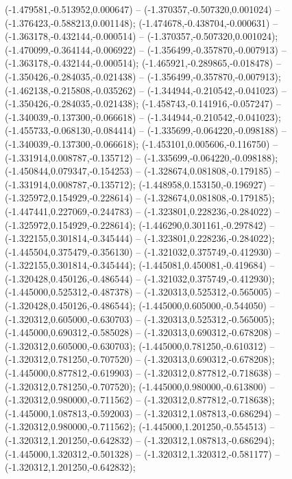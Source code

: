  (-1.479581,-0.513952,0.000647) -- (-1.370357,-0.507320,0.001024) -- (-1.376423,-0.588213,0.001148);
 (-1.474678,-0.438704,-0.000631) -- (-1.363178,-0.432144,-0.000514) -- (-1.370357,-0.507320,0.001024);
 (-1.470099,-0.364144,-0.006922) -- (-1.356499,-0.357870,-0.007913) -- (-1.363178,-0.432144,-0.000514);
 (-1.465921,-0.289865,-0.018478) -- (-1.350426,-0.284035,-0.021438) -- (-1.356499,-0.357870,-0.007913);
 (-1.462138,-0.215808,-0.035262) -- (-1.344944,-0.210542,-0.041023) -- (-1.350426,-0.284035,-0.021438);
 (-1.458743,-0.141916,-0.057247) -- (-1.340039,-0.137300,-0.066618) -- (-1.344944,-0.210542,-0.041023);
 (-1.455733,-0.068130,-0.084414) -- (-1.335699,-0.064220,-0.098188) -- (-1.340039,-0.137300,-0.066618);
 (-1.453101,0.005606,-0.116750) -- (-1.331914,0.008787,-0.135712) -- (-1.335699,-0.064220,-0.098188);
 (-1.450844,0.079347,-0.154253) -- (-1.328674,0.081808,-0.179185) -- (-1.331914,0.008787,-0.135712);
 (-1.448958,0.153150,-0.196927) -- (-1.325972,0.154929,-0.228614) -- (-1.328674,0.081808,-0.179185);
 (-1.447441,0.227069,-0.244783) -- (-1.323801,0.228236,-0.284022) -- (-1.325972,0.154929,-0.228614);
 (-1.446290,0.301161,-0.297842) -- (-1.322155,0.301814,-0.345444) -- (-1.323801,0.228236,-0.284022);
 (-1.445504,0.375479,-0.356130) -- (-1.321032,0.375749,-0.412930) -- (-1.322155,0.301814,-0.345444);
 (-1.445081,0.450081,-0.419684) -- (-1.320428,0.450126,-0.486544) -- (-1.321032,0.375749,-0.412930);
 (-1.445000,0.525312,-0.487378) -- (-1.320313,0.525312,-0.565005) -- (-1.320428,0.450126,-0.486544);
 (-1.445000,0.605000,-0.544050) -- (-1.320312,0.605000,-0.630703) -- (-1.320313,0.525312,-0.565005);
 (-1.445000,0.690312,-0.585028) -- (-1.320313,0.690312,-0.678208) -- (-1.320312,0.605000,-0.630703);
 (-1.445000,0.781250,-0.610312) -- (-1.320312,0.781250,-0.707520) -- (-1.320313,0.690312,-0.678208);
 (-1.445000,0.877812,-0.619903) -- (-1.320312,0.877812,-0.718638) -- (-1.320312,0.781250,-0.707520);
 (-1.445000,0.980000,-0.613800) -- (-1.320312,0.980000,-0.711562) -- (-1.320312,0.877812,-0.718638);
 (-1.445000,1.087813,-0.592003) -- (-1.320312,1.087813,-0.686294) -- (-1.320312,0.980000,-0.711562);
 (-1.445000,1.201250,-0.554513) -- (-1.320312,1.201250,-0.642832) -- (-1.320312,1.087813,-0.686294);
 (-1.445000,1.320312,-0.501328) -- (-1.320312,1.320312,-0.581177) -- (-1.320312,1.201250,-0.642832);
